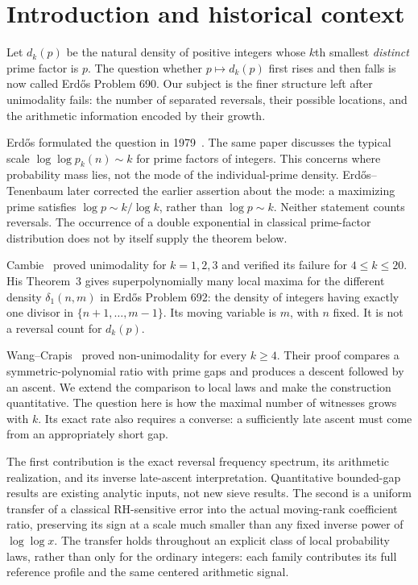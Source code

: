 \documentclass[11pt]{article}
\theoremstyle{definition}
\begin{document}
\section{Introduction and historical context}\label{sec:intro}
Let $d_k(p)$ be the natural density of positive integers whose $k$th
smallest \emph{distinct} prime factor is $p$. The question whether
$p\mapsto d_k(p)$ first rises and then falls is now called Erd\H{o}s
Problem 690. Our subject is the finer structure left after unimodality
fails: the number of separated reversals, their possible locations, and
the arithmetic information encoded by their growth.

Erd\H{o}s formulated the question in 1979~\cite[p.~75]{Erdos}.
The same paper discusses the typical scale $\log\log p_k(n)\sim k$
for prime factors of integers. This concerns where probability mass
lies, not the mode of the individual-prime density. Erd\H{o}s--Tenenbaum
\cite[Corollary~5]{ET} later corrected the earlier assertion about the
mode: a maximizing prime satisfies $\log p\sim k/\log k$, rather than
$\log p\sim k$. Neither statement counts reversals. The occurrence of
a double exponential in classical prime-factor distribution does not
by itself supply the theorem below.

Cambie~\cite[Theorem~5]{Cambie} proved unimodality for $k=1,2,3$ and
verified its failure for $4\le k\le20$. His Theorem~3 gives
superpolynomially many local maxima for the different density
$\delta_1(n,m)$ in Erd\H{o}s Problem 692: the density of integers having
exactly one divisor in $\{n+1,\ldots,m-1\}$. Its moving variable is $m$,
with $n$ fixed. It is not a reversal count for $d_k(p)$.

Wang--Crapis~\cite[Theorem~1.1]{WC} proved non-unimodality for every
$k\ge4$. Their proof compares a symmetric-polynomial ratio with prime
gaps and produces a descent followed by an ascent. We extend the
comparison to local laws and make the construction quantitative.
The question here is how the maximal number of witnesses grows with
$k$. Its exact rate also requires a converse: a sufficiently late
ascent must come from an appropriately short gap.

The first contribution is the exact reversal
frequency spectrum, its arithmetic realization, and its inverse
late-ascent interpretation. Quantitative bounded-gap results are
existing analytic inputs, not new sieve results. The second is a
uniform transfer of a classical RH-sensitive error into the actual
moving-rank coefficient ratio, preserving its sign at a scale much
smaller than any fixed inverse power of $\log\log x$. The transfer holds
throughout an explicit class of local probability laws, rather than only
for the ordinary integers: each family contributes its full reference
profile and the same centered arithmetic signal.
\end{document}

